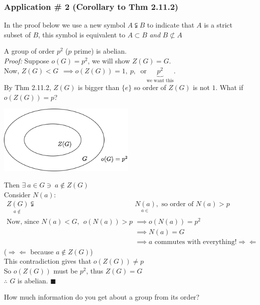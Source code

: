 \subsubsection*{Application \# 2 (Corollary to Thm 2.11.2)}
In the proof below we use a new symbol $A\subsetneqq B$ to indicate that $A$ is a strict subset of $B$, this symbol is equivalent to $A \subset B$ \textit{and} $B \not \subset A$
\begin{corollary}
A group of order $p^2$ ($p$ prime) is abelian. \steezybreak\\
\noindent \textit{Proof:} Suppose $o(G)=p^2$, we will show $Z(G)=G$.\steezybreak\\
Now, $Z(G)<G \ \ \implies o(Z(G)) = 1, \ p, \ \text{ or} \underbrace{p^2}_{\text{we want this}}$. \steezybreak\\
By Thm 2.11.2, $Z(G)$ is bigger than $\{e\}$ so order of $Z(G)$ is not $1$. What if $o(Z(G))= p$?
\begin{center}
    \includegraphics[width=0.5\textwidth]{Figures/Center_of_G.png}
\end{center}
Then $\exists \ a \in G \ni \ a \not\in Z(G)$ \steezybreak\\
Consider $N(a)$: 
\begin{align}
    \underset{a\not \in }{Z(G)} \subsetneqq &\underset{a\in}{N(a)}, \text{ so order of }N(a)>p \nonumber \\ 
    \text{Now, since }N(a) < G, \ \ o(N(a))>p &\implies o(N(a))=p^2 \nonumber \\
    &\implies N(a) = G \nonumber \\
    &\implies a \text{ commutes with everything!} \Rightarrow\Leftarrow
\end{align}
($\Rightarrow\Leftarrow$ because $a\not\in Z(G)$) \steezybreak\\
This contradiction gives that $o(Z(G))\not = p$ \steezybreak\\
So $o(Z(G))$ must be $p^2$, thus $Z(G)=G$ \steezybreak\\
$\therefore$ $G$ is abelian. $\blacksquare$
\end{corollary}

How much information do you get about a group from its order?
